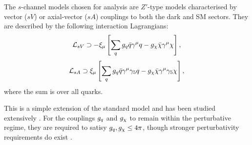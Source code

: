 The $s$-channel models chosen for analysis are $Z'$-type models characterised by vector ($sV$) or axial-vector ($sA$) couplings to both the dark and SM sectors. They are described by the following interaction Lagrangians:
\begin{equation}
\label{L_int_sV}
\mathcal{L}_{sV} \supset - \xi_{\mu}\left[ \sum\limits_{q} g_q\bar{q}\gamma^{\mu}q - g_{\chi}\bar{\chi}\gamma^{\mu}\chi\right],
\end{equation}
\begin{equation}
\label{L_int_sA}
\mathcal{L}_{sA} \supset  \xi_{\mu}\left[\sum\limits_{q} g_q\bar{q}\gamma^{\mu}\gamma_{5}q - g_{\chi}\bar{\chi}\gamma^{\mu}\gamma_{5}\chi\right],
\end{equation}
where the sum is over all quarks. 

This is a simple extension of the standard model and has been studied extensively \cite{Buchmueller:2014yoa, Heisig:2015ira,Blennow:2015gta,Lebedev:2014bba, Alves:2015pea, Alves:2013tqa, Alves:2015mua, An:2012va, An:2012ue, Frandsen:2012rk, Arcadi:2013qia, Shoemaker:2011vi, Frandsen:2011cg, Gondolo:2011eq, Fairbairn:2014aqa, Harris:2014hga, NordstromSVD, Bell:2015rdw, Chala:2015ama, Kahlhoefer:2015bea}.
For the couplings $g_q$ and $g_{\chi}$ to remain within the perturbative regime, they are required to satisy $g_q,g_{\chi} \leq 4\pi$, though stronger perturbativity requirements do exist \cite{ValidEFT}.


